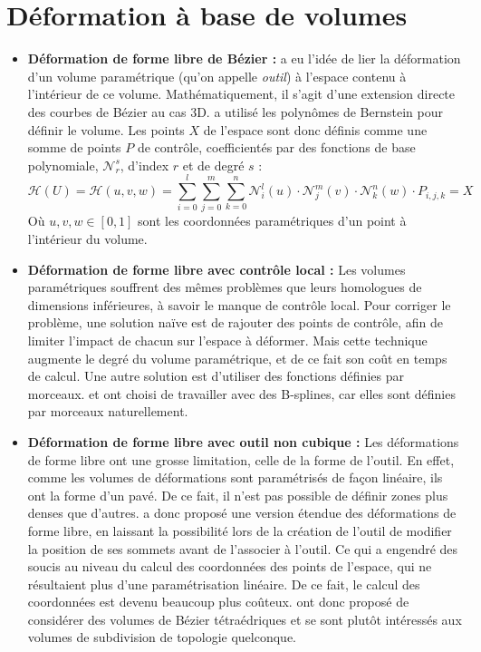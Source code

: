 \section{Déformation à base de volumes}
\begin{itemize}
\item{\textbf{Déformation de forme libre de Bézier :}} \cite{SP86} a
  eu l'idée de lier la déformation d'un volume paramétrique (qu'on
  appelle \textit{outil}) à l'espace contenu à l'intérieur de ce
  volume. Mathématiquement, il s'agit d'une extension directe des
  courbes de Bézier au cas 3D. \cite{SP86} a utilisé les polynômes de
  Bernstein pour définir le volume. Les points $X$ de l'espace sont
  donc définis comme une somme de points $P$ de contrôle,
  coefficientés par des fonctions de base polynomiale,
  $\mathcal{N}_r^s$, d'index $r$ et de degré $s$ :
  \begin{equation}
    \mathcal{H}(U) = \mathcal{H}(u,v,w) = 
    \sum_{i=0}^l \sum_{j=0}^m \sum_{k=0}^n
    \mathcal{N}_i^l(u) \cdot \mathcal{N}_j^m(v) \cdot \mathcal{N}_k^n(w) \cdot P_{i,j,k} = X
  \end{equation}
  Où $u,v,w \in [0,1]$ sont les coordonnées paramétriques d'un point à
  l'intérieur du volume.
\item{\textbf{Déformation de forme libre avec contrôle local :}} Les
  volumes paramétriques souffrent des mêmes problèmes que leurs
  homologues de dimensions inférieures, à savoir le manque de contrôle
  local. Pour corriger le problème, une solution naïve est de rajouter
  des points de contrôle, afin de limiter l'impact de chacun sur
  l'espace à déformer. Mais cette technique augmente le degré du
  volume paramétrique, et de ce fait son coût en temps de calcul. Une
  autre solution est d'utiliser des fonctions définies par
  morceaux. \cite{GP89} et \cite{Com89} ont choisi de travailler avec
  des B-splines, car elles sont définies par morceaux naturellement.
\item{\textbf{Déformation de forme libre avec outil non cubique :}}
  Les déformations de forme libre ont une grosse limitation, celle de
  la forme de l'outil. En effet, comme les volumes de déformations
  sont paramétrisés de façon linéaire, ils ont la forme d'un pavé. De
  ce fait, il n'est pas possible de définir zones plus denses que
  d'autres. \cite{Coq90} a donc proposé une version étendue des
  déformations de forme libre, en laissant la possibilité lors de la
  création de l'outil de modifier la position de ses sommets avant de
  l'associer à l'outil. Ce qui a engendré des soucis au niveau du
  calcul des coordonnées des points de l'espace, qui ne résultaient
  plus d'une paramétrisation linéaire. De ce fait, le calcul des
  coordonnées est devenu beaucoup plus coûteux. \cite{BBT97} ont donc
  proposé de considérer des volumes de Bézier tétraédriques et
  \cite{MJ96} se sont plutôt intéressés aux volumes de subdivision de
  topologie quelconque.
\end{itemize}

